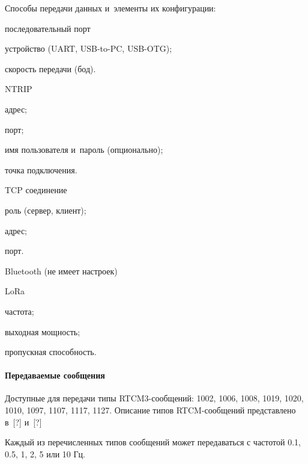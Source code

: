 Способы передачи данных и~элементы их конфигурации:
\begin{dashitemize}
  \item последовательный порт
  \begin{dashitemize}
    \item устройство (UART, USB-to-PC, USB-OTG);
    \item скорость передачи (бод).
  \end{dashitemize}

  \item NTRIP
  \begin{dashitemize}
    \item адрес;
    \item порт;
    \item имя пользователя и~пароль (опционально);
    \item точка подключения.
  \end{dashitemize}

  \item TCP соединение
  \begin{dashitemize}
    \item роль (сервер, клиент);
    \item адрес;
    \item порт.
  \end{dashitemize}

  \item Bluetooth (не имеет настроек)

  \item LoRa
  \begin{dashitemize}
    \item частота;
    \item выходная мощность;
    \item пропускная способность.
  \end{dashitemize}
\end{dashitemize}

\paragraph{Передаваемые сообщения}

Доступные для передачи типы RTCM3-сообщений: 1002, 1006, 1008, 1019, 1020, 1010, 1097, 1107, 1117, 1127. Описание типов RTCM-сообщений представлено в~[?] и~[?]

Каждый из перечисленных типов сообщений может передаваться с частотой 0.1, 0.5, 1, 2, 5 или 10 Гц.

